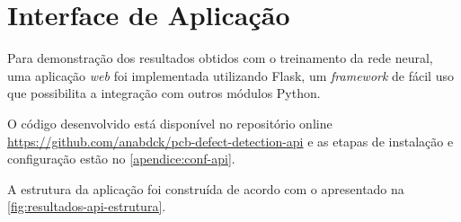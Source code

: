 
\chapter{Interface de Aplicação} \label{cap:api}
Para demonstração dos resultados obtidos com o treinamento da rede neural, uma aplicação \textit{web} foi implementada utilizando Flask, um \textit{framework} de fácil uso que possibilita a integração com outros módulos Python.

O código desenvolvido está disponível no repositório online \url{https://github.com/anabdck/pcb-defect-detection-api} e as etapas de instalação e configuração estão no \autoref{apendice:conf-api}.

A estrutura da aplicação foi construída de acordo com o apresentado na \autoref{fig:resultados-api-estrutura}.


